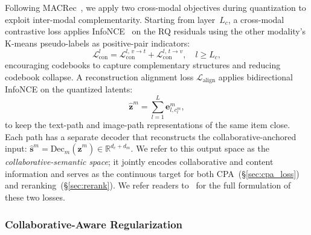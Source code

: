 \documentclass[sigconf, anonymous, review]{acmart}
\begin{document}
Following MACRec~\cite{macrec}, we apply two cross-modal objectives during quantization to exploit inter-modal complementarity.
%
Starting from layer~$L_c$, a cross-modal contrastive loss applies InfoNCE~\cite{oord2018representation} on the RQ residuals using the other modality's K-means pseudo-labels as positive-pair indicators:
\begin{equation}
    \mathcal{L}_{\mathrm{con}}^l = \mathcal{L}_{\mathrm{con}}^{l,\, v \to t} + \mathcal{L}_{\mathrm{con}}^{l,\, t \to v}, \quad l \geq L_c,
\end{equation}
encouraging codebooks to capture complementary structures and reducing codebook collapse.
%
A reconstruction alignment loss $\mathcal{L}_{\text{align}}$ applies bidirectional InfoNCE on the quantized latents:
\begin{equation}
    \hat{\mathbf{z}}^m = \sum_{l=1}^{L}\mathbf{e}_{l,c_l^m}^m,
\end{equation}
to keep the text-path and image-path representations of the same item close.
%
Each path has a separate decoder that reconstructs the collaborative-anchored input: $\hat{\mathbf{s}}^m = \mathrm{Dec}_m(\hat{\mathbf{z}}^m) \in \mathbb{R}^{d_c+d_m}$.
%
We refer to this output space as the \emph{collaborative-semantic space}; it jointly encodes collaborative and content information and serves as the continuous target for both CPA~(\S\ref{sec:cpa_loss}) and reranking~(\S\ref{sec:rerank}).
%
We refer readers to~\citet{macrec} for the full formulation of these two losses.

\subsubsection{Collaborative-Aware Regularization}
\end{document}
